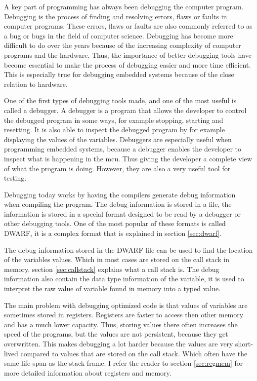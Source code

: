 
A key part of programming has always been debugging the computer program.
Debugging is the process of finding and resolving errors, flaws or faults in computer programs.
These errors, flaws or faults are also commonly referred to as a bug or bugs in the field of computer science.
Debugging has become more difficult to do over the years because of the increasing complexity of computer programs and the hardware.
Thus, the importance of better debugging tools have become essential to make the process of debugging easier and more time efficient.
This is especially true for debugging  embedded systems because of the close relation to hardware.


One of the first types of debugging tools made, and one of the most useful is called a debugger.
A debugger is a program that allows the developer to control the debugged program in some ways, for example stopping, starting and resetting.
It is also able to inspect the debugged program by for example displaying the values of the variables.
Debuggers are especially useful when programming embedded systems, because a debugger enables the developer to inspect what is happening in the \gls{mcu}.
Thus giving the developer a complete view of what the program is doing.
However, they are also a very useful tool for testing.


Debugging today works by having the compilers generate debug information when compiling the program.
The debug information is stored in a file, the information is stored in a special format designed to be read by a debugger or other debugging tools.
One of the most popular of these formats is called \gls{DWARF}, it is a complex format that is explained in section \ref{sec:dwarf}.


The debug information stored in the \gls{DWARF} file can be used to find the location of the variables values.
Which in most cases are stored on the call stack in memory, section \ref{sec:callstack} explains what a call stack is.
The debug information also contain the data type information of the variable, it is used to interpret the raw value of variable found in memory into a typed value.


The main problem with debugging optimized code is that values of variables are sometimes stored in registers.
Registers are faster to access then other memory and has a much lower capacity.
Thus, storing values there often increases the speed of the programs, but the values are not persistent, because they get overwritten.
This makes debugging a lot harder because the values are very short-lived compared to values that are stored on the call stack.
Which often have the same life span as the stack frame.
I refer the reader to section \ref{sec:regmem} for more detailed information about registers and memory.


